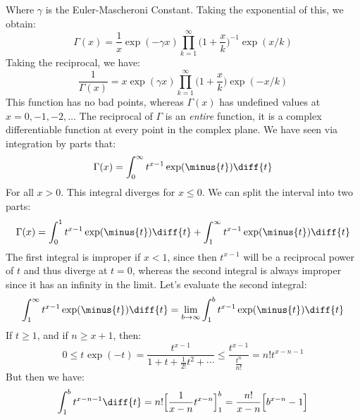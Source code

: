 \documentclass[crop=false,class=book,oneside]{standalone}
\begin{document}
        Where $\gamma$ is the Euler-Mascheroni Constant. Taking
        the exponential of this, we obtain:
        \begin{equation}
            \Gamma(x)=\frac{1}{x}\exp(\minus\gamma{x})
                \prod_{k=1}^{\infty}\Big(1+\frac{x}{k}\Big)^{-1}
                    \exp(x/k)
        \end{equation}
        Taking the reciprocal, we have:
        \begin{equation}
            \frac{1}{\Gamma(x)}=
            x\exp(\gamma{x})
            \prod_{k=1}^{\infty}\Big(1+\frac{x}{k}\Big)
            \exp(\minus{x}/k)
        \end{equation}
        This function has no bad points, whereas $\Gamma(x)$ has
        undefined values at $x=0,\minus{1},\minus{2},\dots$
        The reciprocal of $\Gamma$ is an \textit{entire} function,
        it is a complex differentiable function at every point in
        the complex plane. We have seen via integration by parts
        that:
        \begin{equation}
            \Gamma(x)=\int_{0}^{\infty}t^{x-1}\exp(\minus{t})\diff{t}
        \end{equation}
        For all $x>0$. This integral diverges for $x\leq{0}$.
        We can split the interval into two parts:
        \begin{equation}
            \Gamma(x)=\int_{0}^{1}t^{x-1}\exp(\minus{t})\diff{t}+
                \int_{1}^{\infty}t^{x-1}\exp(\minus{t})\diff{t}
        \end{equation}
        The first integral is improper if $x<1$, since then
        $t^{x-1}$ will be a reciprocal power of $t$ and thus
        diverge at $t=0$, whereas the second integral is always
        improper since it has an infinity in the limit.
        Let's evaluate the second integral:
        \begin{equation}
            \int_{1}^{\infty}t^{x-1}\exp(\minus{t})\diff{t}
            =\underset{b\rightarrow\infty}{\lim}
            \int_{1}^{b}t^{x-1}\exp(\minus{t})\diff{t}
        \end{equation}
        If $t\geq{1}$, and if $n\geq{x}+1$, then:
        \begin{equation}
            0\leq{t}^{}\exp(\minus{t})=
            \frac{t^{x-1}}{1+t+\frac{1}{2!}t^{2}+\cdots}
            \leq\frac{t^{x-1}}{\frac{t^{n}}{n!}}
            =n!t^{x-n-1}
        \end{equation}
        But then we have:
        \begin{equation}
            \int_{1}^{b}t^{x-n-1}\diff{t}=
            n!\Big[\frac{1}{x-n}t^{x-n}\Big]_{1}^{b}
            =\frac{n!}{x-n}\Big[b^{x-n}-1\Big]
        \end{equation}
\end{document}
